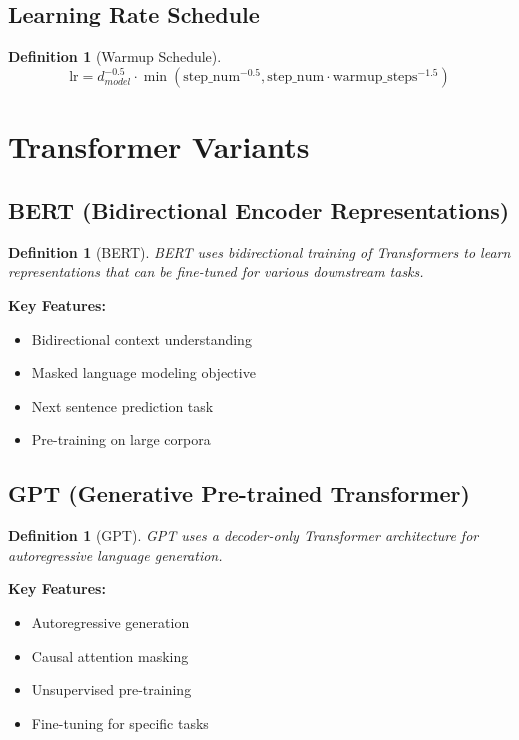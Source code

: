 \documentclass[11pt,a4paper]{article}
\newtheorem{definition}[theorem]{Definition}
\begin{document}
\subsection{Learning Rate Schedule}

\begin{definition}[Warmup Schedule]
$$\text{lr} = d_{model}^{-0.5} \cdot \min(\text{step\_num}^{-0.5}, \text{step\_num} \cdot \text{warmup\_steps}^{-1.5})$$
\end{definition}

\section{Transformer Variants}

\subsection{BERT (Bidirectional Encoder Representations)}

\begin{definition}[BERT]
BERT uses bidirectional training of Transformers to learn representations that can be fine-tuned for various downstream tasks.
\end{definition}

\textbf{Key Features:}
\begin{itemize}
\item Bidirectional context understanding
\item Masked language modeling objective
\item Next sentence prediction task
\item Pre-training on large corpora
\end{itemize}

\subsection{GPT (Generative Pre-trained Transformer)}

\begin{definition}[GPT]
GPT uses a decoder-only Transformer architecture for autoregressive language generation.
\end{definition}

\textbf{Key Features:}
\begin{itemize}
\item Autoregressive generation
\item Causal attention masking
\item Unsupervised pre-training
\item Fine-tuning for specific tasks
\end{itemize}
\end{document}
